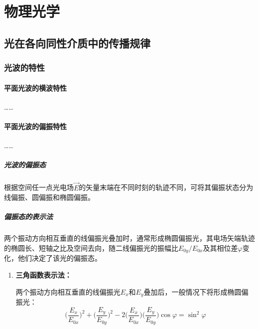 \documentclass[cn,10pt,chinesefont=founder,math=mtpro2,cite=super,toc=onecol,twoside]{elegantbook}
\begin{document}
\part{物理光学}

\chapter{光在各向同性介质中的传播规律}
\section{光波的特性}
\subsection{平面光波的横波特性}
……
\subsection{平面光波的偏振特性}
……
\subsubsection{光波的偏振态}
根据空间任一点光电场$\vec E$的矢量末端在不同时刻的轨迹不同，可将其偏振状态分为线偏振、圆偏振和椭圆偏振。
\subsubsection{偏振态的表示法}
两个振动方向相互垂直的线偏振光叠加时，通常形成椭圆偏振光，其电场矢端轨迹的椭圆长、短轴之比及空间去向，随二线偏振光的振幅比$E_{0y}/E_{0x}$及其相位差$\varphi$变化，他们决定了该光的偏振态。
\begin{enumerate}
	\item \textbf{三角函数表示法：}

	两个振动方向相互垂直的线偏振光$E_x$和$E_y$叠加后，一般情况下将形成椭圆偏振光：
	\begin{equation}
	\bigg(\frac{E_x}{E_{0x}}\bigg)^2+\bigg(\frac{E_y}{E_{0y}}\bigg)^2-2\bigg(\frac{E_x}{E_{0x}}\bigg)\bigg(\frac{E_y}{E_{0y}}\bigg)\cos\varphi=\sin^2\varphi
	\end{equation}
\end{enumerate}
\end{document}
